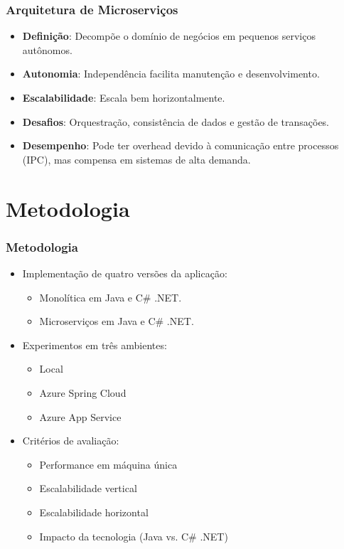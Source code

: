 \documentclass{beamer}
\begin{document}
\begin{frame}
\frametitle{Arquitetura de Microserviços}
\begin{itemize}
    \item \textbf{Definição}: Decompõe o domínio de negócios em pequenos serviços autônomos.
    \item \textbf{Autonomia}: Independência facilita manutenção e desenvolvimento.
    \item \textbf{Escalabilidade}: Escala bem horizontalmente.
    \item \textbf{Desafios}: Orquestração, consistência de dados e gestão de transações.
    \item \textbf{Desempenho}: Pode ter overhead devido à comunicação entre processos (IPC), mas compensa em sistemas de alta demanda.
\end{itemize}
\end{frame}

\section{Metodologia}

\begin{frame}
\frametitle{Metodologia}
\begin{itemize}
    \item Implementação de quatro versões da aplicação:
    \begin{itemize}
        \item Monolítica em Java e C\# .NET.
        \item Microserviços em Java e C\# .NET.
    \end{itemize}
    \item Experimentos em três ambientes:
    \begin{itemize}
        \item Local
        \item Azure Spring Cloud
        \item Azure App Service
    \end{itemize}
    \item Critérios de avaliação:
    \begin{itemize}
        \item Performance em máquina única
        \item Escalabilidade vertical
        \item Escalabilidade horizontal
        \item Impacto da tecnologia (Java vs. C\# .NET)
    \end{itemize}
\end{itemize}
\end{frame}
\end{document}
